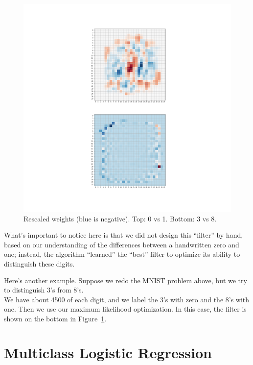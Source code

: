 \documentclass[
  11pt,
  letterpaper,
]{scrbook}
\theoremstyle{plain}
\theoremstyle{plain}
\theoremstyle{remark}
\begin{document}
\begin{figure}

{\centering \includegraphics[width=1\textwidth,height=\textheight]{chapters/img/weights.png}

}

\caption{\label{fig-weights}Rescaled weights (blue is negative). Top: 0
vs 1. Bottom: 3 vs 8.}

\end{figure}

What's important to notice here is that we did not design this
``filter'' by hand, based on our understanding of the differences
between a handwritten zero and one; instead, the algorithm ``learned''
the ``best'' filter to optimize its ability to distinguish these digits.

Here's another example. Suppose we redo the MNIST problem above, but we
try to distinguish 3's from 8's.\\
We have about 4500 of each digit, and we label the 3's with zero and the
8's with one. Then we use our maximum likelihood optimization. In this
case, the filter is shown on the bottom in Figure~\ref{fig-weights}.

\hypertarget{multiclass-logistic-regression}{%
\section{Multiclass Logistic
Regression}\label{multiclass-logistic-regression}}
\end{document}
